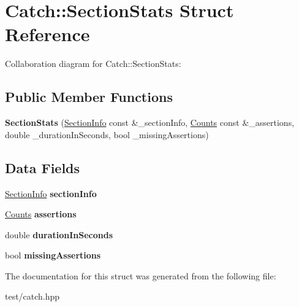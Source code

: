 \hypertarget{structCatch_1_1SectionStats}{}\section{Catch\+:\+:Section\+Stats Struct Reference}
\label{structCatch_1_1SectionStats}


Collaboration diagram for Catch\+:\+:Section\+Stats\+:
\subsection*{Public Member Functions}
\begin{DoxyCompactItemize}
\item 
{\bfseries Section\+Stats} (\hyperlink{structCatch_1_1SectionInfo}{Section\+Info} const \&\+\_\+section\+Info, \hyperlink{structCatch_1_1Counts}{Counts} const \&\+\_\+assertions, double \+\_\+duration\+In\+Seconds, bool \+\_\+missing\+Assertions)\hypertarget{structCatch_1_1SectionStats_abadf375cb596682e34781b606eb10bfe}{}\label{structCatch_1_1SectionStats_abadf375cb596682e34781b606eb10bfe}

\end{DoxyCompactItemize}
\subsection*{Data Fields}
\begin{DoxyCompactItemize}
\item 
\hyperlink{structCatch_1_1SectionInfo}{Section\+Info} {\bfseries section\+Info}\hypertarget{structCatch_1_1SectionStats_a524d0cd3b91acc6a4d0f24d6e50275bb}{}\label{structCatch_1_1SectionStats_a524d0cd3b91acc6a4d0f24d6e50275bb}

\item 
\hyperlink{structCatch_1_1Counts}{Counts} {\bfseries assertions}\hypertarget{structCatch_1_1SectionStats_a789bbc5c115f2914286458d282430685}{}\label{structCatch_1_1SectionStats_a789bbc5c115f2914286458d282430685}

\item 
double {\bfseries duration\+In\+Seconds}\hypertarget{structCatch_1_1SectionStats_ae3276a60071b4221907a571b822b0a94}{}\label{structCatch_1_1SectionStats_ae3276a60071b4221907a571b822b0a94}

\item 
bool {\bfseries missing\+Assertions}\hypertarget{structCatch_1_1SectionStats_a4840f83088787653a656c98e664e6b51}{}\label{structCatch_1_1SectionStats_a4840f83088787653a656c98e664e6b51}

\end{DoxyCompactItemize}


The documentation for this struct was generated from the following file\+:\begin{DoxyCompactItemize}
\item 
test/catch.\+hpp\end{DoxyCompactItemize}
